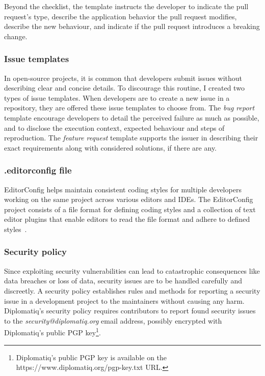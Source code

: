 Beyond the checklist, the template instructs the developer to indicate the pull request's type, describe the application behavior the pull request modifies, describe the new behaviour, and indicate if the pull request introduces a breaking change.

\subsubsection{Issue templates}

In open-source projects, it is common that developers submit issues without describing clear and concise details. To discourage this routine, I created two types of issue templates. When developers are to create a new issue in a repository, they are offered these issue templates to choose from. The \emph{bug report} template encourage developers to detail the perceived failure as much as possible, and to disclose the execution context, expected behaviour and steps of reproduction. The \emph{feature request} template supports the issuer in describing their exact requirements along with considered solutions, if there are any.

\subsubsection{.editorconfig file}

EditorConfig helps maintain consistent coding styles for multiple developers working on the same project across various editors and IDEs. The EditorConfig project consists of a file format for defining coding styles and a collection of text editor plugins that enable editors to read the file format and adhere to defined styles~\cite{editorconfig}.

\subsubsection{Security policy}

Since exploiting security vulnerabilities can lead to catastrophic consequences like data breaches or loss of data, security issues are to be handled carefully and discreetly. A security policy establishes rules and methods for reporting a security issue in a development project to the maintainers without causing any harm. Diplomatiq's security policy requires contributors to report found security issues to the \emph{security@diplomatiq.org} email address, possibly encrypted with Diplomatiq's public PGP key\footnote{Diplomatiq's public PGP key is available on the https://www.diplomatiq.org/pgp-key.txt URL.}.

